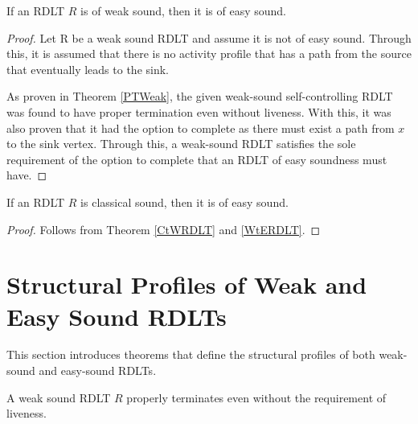 \begin{thm} 
    If an RDLT $ R $ is of weak sound, then it is of easy sound.
    \label{WtERDLT}
\end{thm}

\begin{proof}

    Let R be a weak sound RDLT and assume it is not of easy sound. Through this, it is assumed that there is no activity profile that has a path from the source that eventually leads to the sink.
    
    As proven in Theorem \ref{PTWeak}, the given weak-sound self-controlling RDLT was found to have proper termination even without liveness. With this, it was also proven that it had the option to complete as there must exist a path from $ x $ to the sink vertex. Through this, a weak-sound RDLT satisfies the sole requirement of the option to complete that an RDLT of easy soundness must have.
    
\end{proof}

\begin{cor}
    If an RDLT $ R $ is classical sound, then it is of easy sound.
    \label{CtERDLT}
\end{cor}

\begin{proof}
    Follows from Theorem \ref{CtWRDLT} and \ref{WtERDLT}.
\end{proof}

\section{Structural Profiles of Weak and Easy Sound RDLTs}

This section introduces theorems that define the structural profiles of both weak-sound and easy-sound RDLTs.

\begin{thm} 
    A weak sound RDLT $ R $ properly terminates even without the requirement of liveness.
    \label{PTWeak}
\end{thm}

